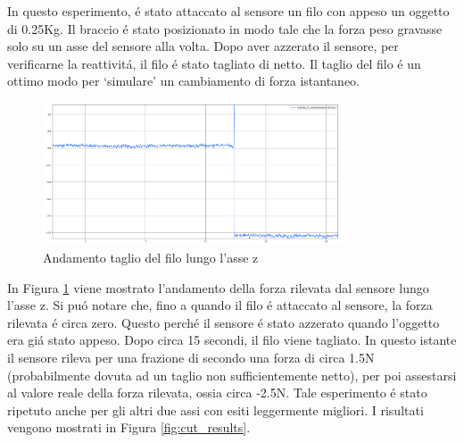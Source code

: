 In questo esperimento, \'{e} stato attaccato al sensore un filo con appeso un oggetto di 0.25Kg. 
Il braccio \'{e} stato posizionato in modo tale che la forza peso gravasse solo su un asse del sensore alla volta. 
Dopo aver azzerato il sensore, per verificarne la reattivit\'{a}, il filo \'{e} stato tagliato di netto. 
Il taglio del filo \'{e} un ottimo modo per `simulare' un cambiamento di forza istantaneo.
\begin{figure}[H]
    \centering
    \includegraphics*[width=0.80\textwidth]{images/z_cut.png}
    \caption{Andamento taglio del filo lungo l'asse z}
    \label{fig:z_cut}
\end{figure}
In Figura \ref{fig:z_cut} viene mostrato l'andamento della forza rilevata dal sensore lungo l'asse z. 
Si pu\'{o} notare che, fino a quando il filo \'{e} attaccato al sensore, la forza rilevata \'{e} circa zero. 
Questo perch\'{e} il sensore \'{e} stato azzerato quando l'oggetto era gi\'{a} stato appeso. 
Dopo circa 15 secondi, il filo viene tagliato. In questo istante il sensore rileva per una frazione di secondo una forza di circa 1.5N 
(probabilmente dovuta ad un taglio non sufficientemente netto), per poi assestarsi al valore reale della forza rilevata, 
ossia circa -2.5N. 
Tale esperimento \'{e} stato ripetuto anche per gli altri due assi con esiti leggermente migliori. 
I risultati vengono mostrati in Figura \ref{fig:cut_results}.
